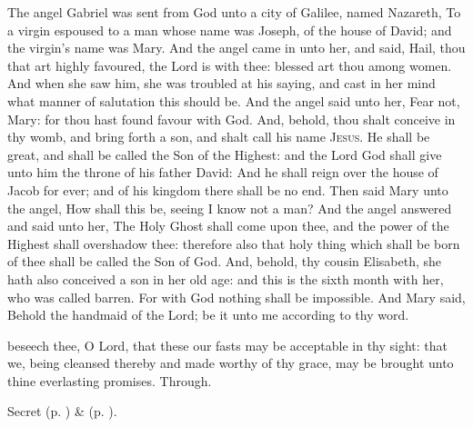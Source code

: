 
 The angel Gabriel was sent from God unto a city of Galilee, named Nazareth, To a virgin espoused to a man whose name was Joseph, of the house of David; and the virgin's name was Mary. And the angel came in unto her, and said, Hail, thou that art highly favoured, the Lord is with thee: blessed art thou among women. And when she saw him, she was troubled at his saying, and cast in her mind what manner of salutation this should be. And the angel said unto her, Fear not, Mary: for thou hast found favour with God. And, behold, thou shalt conceive in thy womb, and bring forth a son, and shalt call his name \textsc{Jesus}. He shall be great, and shall be called the Son of the Highest: and the Lord God shall give unto him the throne of his father David: And he shall reign over the house of Jacob for ever; and of his kingdom there shall be no end. Then said Mary unto the angel, How shall this be, seeing I know not a man? And the angel answered and said unto her, The Holy Ghost shall come upon thee, and the power of the Highest shall overshadow thee: therefore also that holy thing which shall be born of thee shall be called the Son of God. And, behold, thy cousin Elisabeth, she hath also conceived a son in her old age: and this is the sixth month with her, who was called barren. For with God nothing shall be impossible. And Mary said, Behold the handmaid of the Lord; be it unto me according to thy word.


\vspace{-0.25\baselineskip}

\secret

\vspace{-0.1\baselineskip}

 beseech thee, O Lord, that these our fasts may be acceptable in thy sight: that we, being cleansed thereby and made worthy of thy grace, may be brought unto thine everlasting promises. Through.

\begin{rubric}
     Secret  (p. \pageref{AdventISecret}) \&   (p. \pageref{SPMaryInAdvent}).
\end{rubric}

